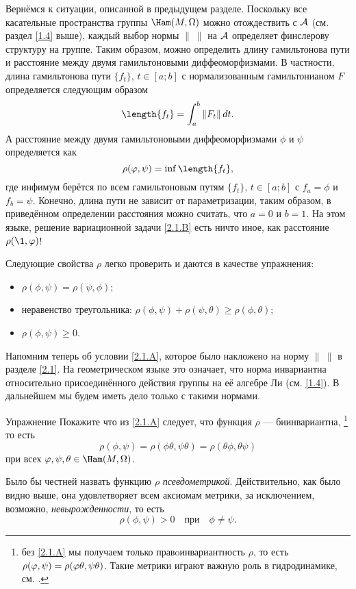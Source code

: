 Вернёмся к ситуации, описанной в предыдущем разделе.
Поскольку все касательные пространства группы $\Ham(M, \Omega)$ можно
отождествить с $\mathcal{A}$ (см. раздел \ref{1.4} выше), каждый выбор нормы
$\|\ \|$ на $\mathcal{A}$ определяет финслерову структуру на группе.
Таким образом, можно определить длину гамильтонова пути и расстояние между двумя гамильтоновыми диффеоморфизмами.
В частности, длина гамильтонова пути $\{f_t\}$, $t \in [a; b]$ с нормализованным гамильтонианом $F$ определяется следующим образом 
\[\length\{f_t\}=\int_a^b \| F_t \|\,dt.\]
А расстояние между двумя гамильтоновыми диффеоморфизмами $\phi$ и $\psi$ определяется как
\[\rho (\phi, \psi) = \inf \length \{f_t\},\] 
где инфимум берётся по всем гамильтоновым путям $\{f_t\}$, $t \in [a; b]$ с $f_a = \phi$ и $f_b = \psi$.
Конечно, длина пути не зависит от параметризации, таким образом, в приведённом определении расстояния можно считать, что $a = 0$ и $b = 1$.
На этом языке, решение вариационной задачи
\ref{2.1.B} есть ничто иное, как расстояние $\rho (\1, \phi)$!

Следующие свойства $\rho$ легко проверить и даются в качестве упражнения:
\begin{itemize}
\item $\rho (\phi, \psi) = \rho (\psi, \phi)$;
\item неравенство треугольника: $\rho (\phi, \psi) + \rho (\psi, \theta) \ge \rho (\phi, \theta)$;
\item $\rho (\phi, \psi) \ge 0$.
\end{itemize}

Напомним теперь об условии \ref{2.1.A}, которое было накложено на норму $\|\ \|$ в разделе \ref{2.1}.
На геометрическом языке это означает, что норма инвариантна относительно присоединённого действия группы на её алгебре Ли (см. \ref{1.4}).
В дальнейшем мы будем иметь дело только с такими нормами.

\begin{ex*}{Упражнение}
Покажите что из \ref{2.1.A} следует, что функция $\rho$ --- биинвариантна,%
\footnote{без \ref{2.1.A} мы получаем только правoинвариантность $\rho$, то есть $\rho (\phi, \psi) \z= \rho (\phi\theta, \psi\theta)$.
Такие метрики играют важную роль в гидродинамике, см. \cite{AK}.}
то есть
\[\rho (\phi, \psi) = \rho (\phi \theta, \psi \theta) = \rho (\theta\phi, \theta\psi)\]
при всех $\phi, \psi, \theta \in \Ham (M, \Omega)$.
\end{ex*}

Было бы честней назвать функцию $\rho$ \emph{псевдометрикой}.
Действительно, как было видно выше, она удовлетворяет всем аксиомам метрики, за исключением, возможно, {}\emph{невырожденности}, то есть 
\begin{equation}
\rho (\phi, \psi)> 0
\quad\text{при}\quad
\phi \ne \psi.
\label{eq:2.2.A}
\end{equation}

